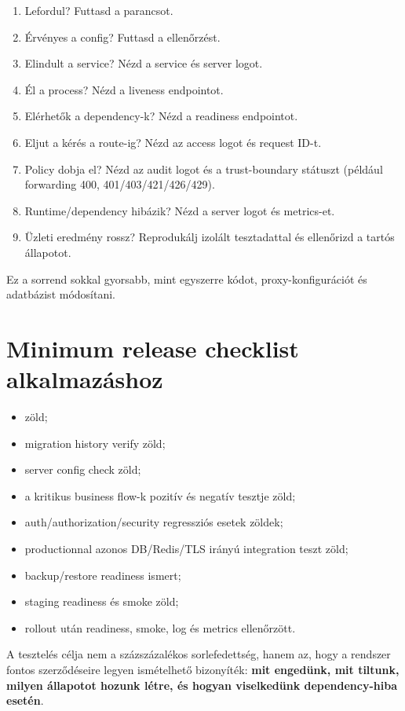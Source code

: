 \begin{enumerate}
  \item Lefordul? Futtasd a  parancsot.
  \item Érvényes a config? Futtasd a  ellenőrzést.
  \item Elindult a service? Nézd a service és server logot.
  \item Él a process? Nézd a liveness endpointot.
  \item Elérhetők a dependency-k? Nézd a readiness endpointot.
  \item Eljut a kérés a route-ig? Nézd az access logot és request ID-t.
  \item Policy dobja el? Nézd az audit logot és a trust-boundary státuszt (például forwarding 400, 401/403/421/426/429).
  \item Runtime/dependency hibázik? Nézd a server logot és metrics-et.
  \item Üzleti eredmény rossz? Reprodukálj izolált tesztadattal és ellenőrizd a tartós állapotot.
\end{enumerate}

Ez a sorrend sokkal gyorsabb, mint egyszerre kódot, proxy-konfigurációt és adatbázist módosítani.

\section{Minimum release checklist alkalmazáshoz}

\begin{itemize}
  \item {} zöld;
  \item migration history verify zöld;
  \item server config check zöld;
  \item a kritikus business flow-k pozitív és negatív tesztje zöld;
  \item auth/authorization/security regressziós esetek zöldek;
  \item productionnal azonos DB/Redis/TLS irányú integration teszt zöld;
  \item backup/restore readiness ismert;
  \item staging readiness és smoke zöld;
  \item rollout után readiness, smoke, log és metrics ellenőrzött.
\end{itemize}

A tesztelés célja nem a százszázalékos sorlefedettség, hanem az, hogy a rendszer fontos szerződéseire legyen ismételhető bizonyíték: \textbf{mit engedünk, mit tiltunk, milyen állapotot hozunk létre, és hogyan viselkedünk dependency-hiba esetén}.
